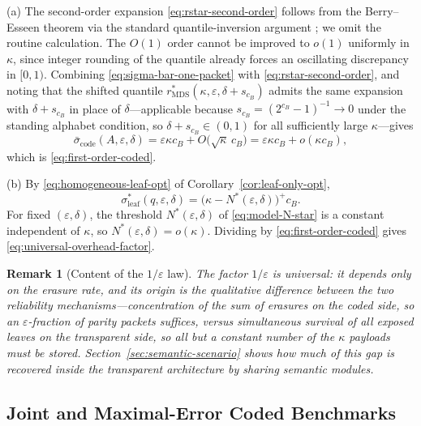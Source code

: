 \documentclass[journal]{IEEEtran}
\makeatletter
\newtheorem{remark}{Remark}[section]
\numberwithin{equation}{section}
\renewenvironment{proof}[1][\proofname]{\par
  \pushQED{\qed}%
  \normalfont \topsep6\p@\@plus6\p@\relax
  \trivlist
  \item[\hskip\labelsep
        \itshape
    #1\@addpunct{.}]\ignorespaces
}{%
  \popQED\endtrivlist\@endpefalse
}
\makeatother
\begin{document}
\begin{proof}
(a) The second-order expansion \eqref{eq:rstar-second-order} follows from
the Berry--Esseen theorem via the standard quantile-inversion argument
\cite{feller1991introduction,shevtsova2010berry,shevtsova2011absolute,polyanskiy2010channel};
we omit the routine calculation.  The \(O(1)\) order cannot be improved to
\(o(1)\) uniformly in \(\kappa\), since integer rounding of the quantile
already forces an oscillating discrepancy in \([0,1)\).  Combining
\eqref{eq:sigma-bar-one-packet} with \eqref{eq:rstar-second-order}, and
noting that the shifted quantile
\(r_{\mathrm{MDS}}^*(\kappa,\varepsilon,\delta+s_{c_B})\) admits the same
expansion with \(\delta+s_{c_B}\) in place of \(\delta\)---applicable
because \(s_{c_B}=(2^{c_B}-1)^{-1}\to0\) under the standing alphabet
condition, so \(\delta+s_{c_B}\in(0,1)\) for all sufficiently large
\(\kappa\)---gives
\[
  \bar\sigma_{\mathrm{code}}(A,\varepsilon,\delta)
  =
  \varepsilon\kappa c_B
  +
  O\!\bigl(\sqrt{\kappa}\,c_B\bigr)
  =
  \varepsilon\kappa c_B+o(\kappa c_B),
\]
which is \eqref{eq:first-order-coded}.

(b) By \eqref{eq:homogeneous-leaf-opt} of
Corollary~\ref{cor:leaf-only-opt},
\[
  \sigma_{\mathrm{leaf}}^*(q,\varepsilon,\delta)
  =
  \bigl(\kappa-N^*(\varepsilon,\delta)\bigr)^+c_B.
\]
For fixed \((\varepsilon,\delta)\), the threshold
\(N^*(\varepsilon,\delta)\) of \eqref{eq:model-N-star} is a constant
independent of \(\kappa\), so \(N^*(\varepsilon,\delta)=o(\kappa)\).
Dividing by \eqref{eq:first-order-coded} gives
\eqref{eq:universal-overhead-factor}.
\end{proof}

\begin{remark}[Content of the \(1/\varepsilon\) law]
\label{rem:overhead-law-content}
The factor \(1/\varepsilon\) is universal: it depends only on the erasure
rate, and its origin is the qualitative difference between the two
reliability mechanisms---concentration of the \emph{sum} of erasures on the
coded side, so an \(\varepsilon\)-fraction of parity packets suffices,
versus \emph{simultaneous survival} of all exposed leaves on the transparent
side, so all but a constant number of the \(\kappa\) payloads must be
stored.  Section~\ref{sec:semantic-scenario} shows how much of this gap is
recovered inside the transparent architecture by sharing semantic modules.
\end{remark}

\subsection{Joint and Maximal-Error Coded Benchmarks}
\label{subsec:coded-joint-max-benchmarks}
\end{document}

